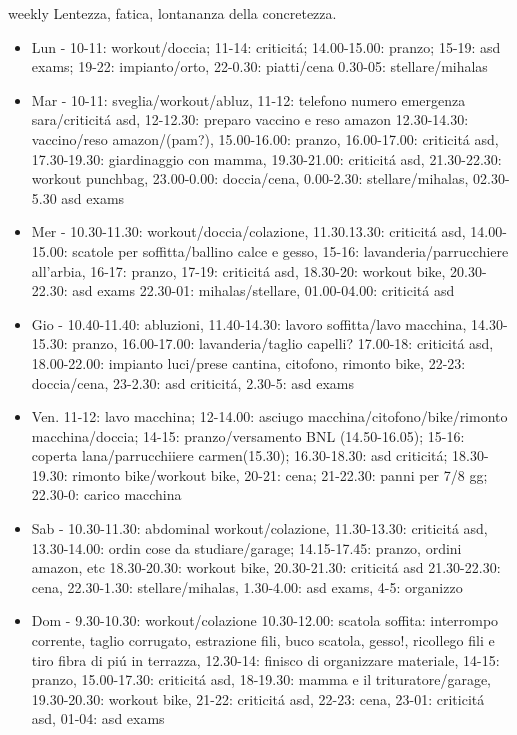 \documentclass[10pt,xcolor={usenames},fleqn,mathserif,serif]{beamer}
\begin{document}
\begin{frame}[allowframebreaks]{weekly}
Lentezza, fatica, lontananza della concretezza. 
\begin{itemize}
    \item Lun - 10-11: workout/doccia; 11-14: criticit\'a; 14.00-15.00: pranzo; 15-19: asd exams; 19-22: impianto/orto, 22-0.30: piatti/cena 0.30-05: stellare/mihalas
    \item Mar - 10-11: sveglia/workout/abluz, 11-12: telefono numero emergenza sara/criticit\'a asd, 12-12.30: preparo vaccino e reso amazon 12.30-14.30: vaccino/reso amazon/(pam?), 15.00-16.00: pranzo, 16.00-17.00: criticit\'a asd, 17.30-19.30: giardinaggio con mamma, 19.30-21.00: criticit\'a asd, 21.30-22.30: workout punchbag, 23.00-0.00: doccia/cena, 0.00-2.30: stellare/mihalas, 02.30-5.30 asd exams
    \item Mer - 10.30-11.30: workout/doccia/colazione, 11.30.13.30: criticit\'a asd, 14.00-15.00: scatole per soffitta/ballino calce e gesso, 15-16: lavanderia/parrucchiere all'arbia, 16-17: pranzo, 17-19: criticit\'a asd, 18.30-20: workout bike, 20.30-22.30: asd exams 22.30-01: mihalas/stellare, 01.00-04.00: criticit\'a asd
    \item Gio - 10.40-11.40: abluzioni, 11.40-14.30: lavoro soffitta/lavo macchina, 14.30-15.30: pranzo, 16.00-17.00: lavanderia/taglio capelli? 17.00-18: criticit\'a asd, 18.00-22.00: impianto luci/prese cantina, citofono, rimonto bike, 22-23: doccia/cena, 23-2.30: asd criticit\'a, 2.30-5: asd exams
    \item Ven. 11-12: lavo macchina; 12-14.00: asciugo macchina/citofono/bike/rimonto macchina/doccia; 14-15: pranzo/versamento BNL (14.50-16.05); 15-16: coperta lana/parrucchiiere carmen(15.30); 16.30-18.30: asd criticit\'a; 18.30-19.30: rimonto bike/workout bike, 20-21: cena; 21-22.30: panni per 7/8 gg; 22.30-0: carico macchina
    \item Sab - 10.30-11.30: abdominal workout/colazione, 11.30-13.30: criticit\'a asd, 13.30-14.00: ordin cose da studiare/garage; 14.15-17.45: pranzo, ordini amazon, etc 18.30-20.30: workout bike, 20.30-21.30: criticit\'a asd 21.30-22.30: cena, 22.30-1.30: stellare/mihalas, 1.30-4.00: asd exams, 4-5: organizzo
    \item Dom - 9.30-10.30: workout/colazione 10.30-12.00: scatola soffita: interrompo corrente, taglio corrugato, estrazione fili, buco scatola, gesso!, ricollego fili e tiro fibra di pi\'u in terrazza, 12.30-14: finisco di organizzare materiale, 14-15: pranzo, 15.00-17.30: criticit\'a asd, 18-19.30: mamma e il trituratore/garage, 19.30-20.30: workout bike, 21-22: criticit\'a asd, 22-23: cena, 23-01: criticit\'a asd, 01-04: asd exams
\end{itemize}
\end{frame}
\end{document}
